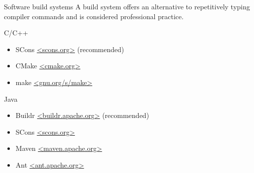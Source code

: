 \begin{block}{Software build systems}
  A build system offers an alternative to repetitively typing compiler commands and is considered professional practice.
  \begin{indented_itemize}
  \item C/C++
    \begin{itemize}
    \item SCons \url{<scons.org>} (recommended)
    \item CMake \url{<cmake.org>}
    \item make \url{<gnu.org/s/make>}
    \end{itemize}
  \item Java
    \begin{itemize}
    \item Buildr \url{<buildr.apache.org>} (recommended)
    \item SCons \url{<scons.org>}
    \item Maven \url{<maven.apache.org>}
    \item Ant \url{<ant.apache.org>}
    \end{itemize}
  \end{indented_itemize}
\end{block}
